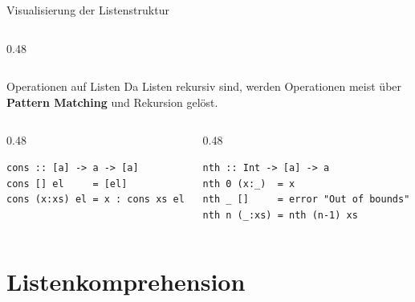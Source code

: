 \documentclass[aspectratio=169,11pt]{beamer}
\begin{document}
\begin{frame}[fragile]{Visualisierung der Listenstruktur}
\begin{columns}[T]
\begin{column}{0.48\textwidth}
\begin{center}
            \end{center}
        \end{column}
    \end{columns}
\end{frame}

\begin{frame}[fragile]{Operationen auf Listen}
    Da Listen rekursiv sind, werden Operationen meist über \textbf{Pattern Matching} und Rekursion gelöst.
    
    \begin{columns}[T]
        \begin{column}{0.48\textwidth}
            \begin{tcolorbox}[modernbox, title=Element anfügen (Cons)]
\begin{lstlisting}
cons :: [a] -> a -> [a]
cons [] el     = [el]
cons (x:xs) el = x : cons xs el
\end{lstlisting}
            \end{tcolorbox}
        \end{column}
        \begin{column}{0.48\textwidth}
            \begin{tcolorbox}[modernbox, title=n-tes Element finden]
\begin{lstlisting}
nth :: Int -> [a] -> a
nth 0 (x:_)  = x
nth _ []     = error "Out of bounds"
nth n (_:xs) = nth (n-1) xs
\end{lstlisting}
            \end{tcolorbox}
        \end{column}
    \end{columns}
\end{frame}

\section{Listenkomprehension}
\end{document}
